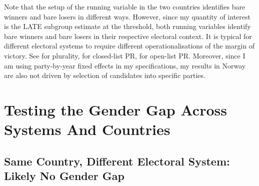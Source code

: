 \documentclass[12pt]{article}
\begin{document}
Note that the setup of the running variable in the two countries identifies bare winners and bare losers in different ways.
However, since my quantity of interest is the LATE subgroup estimate at the threshold, both running variables identify bare winners and bare losers in their respective electoral context. It is typical for different electoral systems to require different operationalisations of the margin of victory. See \citet{eggers2015a} for plurality, \citet{folke2014,fiva2018b,fiva2016} for closed-list PR, \citet{folke2016d,fiva2018a} for open-list PR. Moreover, since I am using party-by-year fixed effects in my specifications, my results in Norway are also not driven by selection of candidates into specific parties.

\pagebreak
\clearpage

\section{Testing the Gender Gap Across Systems And Countries}
\label{app:case_extension}

\subsection{Same Country, Different Electoral System: Likely No Gender Gap}



\end{document}
